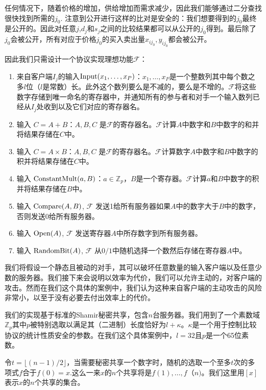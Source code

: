 任何情况下，随着价格的增加，供给增加而需求减少，因此我们能够通过二分查找很快找到所需的$j_0$. 注意到公开进行这样的比对是安全的：我们想要得到的$j_0$最终是公开的。因此对任意$j$,$d_j$和$s_j$之间的比较结果都可以从公开的$j_0$得到。最后除了$j_0$会被公开，所有对应于价格$j_0$的买入卖出量$x_{ij_0},y_{ij_0}$都会被公开。

因此我们只需设计一个协议实现理想功能$\mathcal{F}$：
\begin{enumerate}
	\item
	来自客户端$I_j$的输入$\textup{Input}(x_1,\dots,x_P)$：$x_1,\dots,x_P$是一个整数列其中每个数之多$l$位（$l$是常数）长。此外这个数列要么是不减的，要么是不增的。$\mathcal{F}$将这些数字存储到唯一命名的寄存器中，并通知所有的参与者和对手一个输入数列已经从$I_j$处收到以及它们对应的寄存器名。
	\item
	输入 $C=A+B$：$A,B,C$ 是$\mathcal{F}$的寄存器名。$\mathcal{F}$计算$A$中数字和$B$中数字的和并将结果存储在$C$中。
	\item 
	输入 $C=A\times B$：$A,B,C$ 是$\mathcal{F}$的寄存器名。$\mathcal{F}$计算数字$A$中数字和$B$中数字的积并将结果存储在$C$中。
	\item
	输入 $\textup{ConstantMult}(a,B)$：$a\in \mathbb{Z}_p$，$B$是一个寄存器。$\mathcal{F}$计算$a$和$B$中数字的积并将结果存储在$B$中。
	\item
	输入 $\textup{Compare}(A,B)$, $\mathcal{F}$ 发送1给所有服务器如果$A$中的数字大于$B$中的数字，否则发送0给所有服务器。
	\item 
	输入 $\textup{Open}(A)$, $\mathcal{F}$ 发送寄存器$A$中所存数字到所有服务器。
	\item 
	输入 $\textup{RandomBit}(A)$, $\mathcal{F}$ 从$0/1$中随机选择一个数然后存储在寄存器$A$中。
\end{enumerate}

我们将假设一个静态且被动的对手，其可以破坏任意数量的输入客户端以及任意少数的服务器。我们接下来会说明以效率为代价，我们可以允许主动的，对客户端的攻击。然而在我们这个具体的案例中，我们认为这种来自客户端的主动攻击的风险非常小，以至于没有必要去付出效率上的代价。

我们的实现基于标准的Shamir秘密共享，包含$n$台服务器。我们用到了一个素数域$\mathbb{Z}_p$其中$p$被特别选取以满足其（二进制）长度恰好为$l+\kappa$。$\kappa$是一个用于控制比较协议的统计性质安全的参数。在我们这个具体案例中，$l=32$且$p$是一个65位素数。

令$t=\lfloor(n-1)/2\rfloor$，当需要秘密共享一个数字时，随机的选取一个至多$t$次的多项式$f$合于$f(0)=x$.这么一来$x$的$n$个共享将是$f(1),\dots,f（n)$。我们这里用$[x]$表示$x$的$n$个共享的集合。

